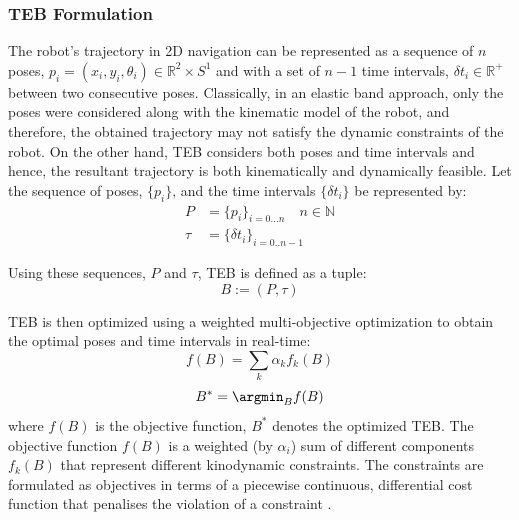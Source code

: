\subsubsection{TEB Formulation}
The robot's trajectory in 2D navigation can be represented as a sequence of $n$ poses, $p_i = (x_i, y_i, \theta_i) \in \mathbb{R}^2 \times S^1$  and with a set of $n-1$ time intervals, $\delta t_i \in \mathbb{R}^+$ between two consecutive poses. Classically, in an elastic band \cite{quinlan1993elastic} approach, only the poses were considered along with the kinematic model of the robot, and therefore, the obtained trajectory may not satisfy the dynamic constraints of the robot. On the other hand, TEB considers both poses and time intervals and hence, the resultant trajectory is both kinematically and dynamically feasible. Let the sequence of poses, $\{p_i\}$, and the time intervals $\{\delta t_i\}$ be represented by:
\begin{equation*}
    \begin{aligned}
      P & = \{p_i\}_{i=0...n} \quad n \in \mathbb{N} \\
      \tau & = \{\delta t_i\}_{i=0..n-1} 
    \end{aligned}
\end{equation*}

Using these sequences, $P$ and $\tau$, TEB is defined as a tuple:
\begin{equation}
    B := (P,\tau)
\end{equation}

TEB is then optimized using a weighted multi-objective optimization to obtain the optimal poses and time intervals in real-time:
\begin{equation}
    f(B) = \sum_k \alpha_kf_k(B)
\end{equation}
\begin{equation}
    B^* = \argmin_B f(B)
\end{equation}
where $f(B)$ is the objective function, $B^*$ denotes the optimized TEB. The objective function $f(B)$ is a weighted (by $\alpha_i$) sum of different components $f_k(B)$ that represent different kinodynamic constraints. The constraints are formulated as objectives in terms of a piecewise continuous, differential cost function that penalises the violation of a constraint \cite{rosmann2013efficient}.


